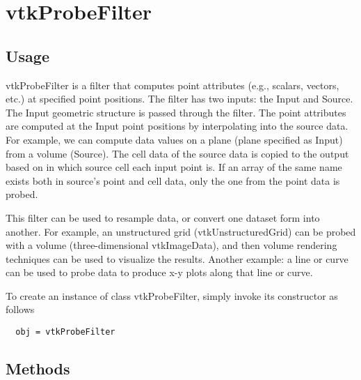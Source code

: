 \section{vtkProbeFilter}

\subsection{Usage}

 vtkProbeFilter is a filter that computes point attributes (e.g., scalars,
 vectors, etc.) at specified point positions. The filter has two inputs:
 the Input and Source. The Input geometric structure is passed through the
 filter. The point attributes are computed at the Input point positions
 by interpolating into the source data. For example, we can compute data
 values on a plane (plane specified as Input) from a volume (Source).
 The cell data of the source data is copied to the output based on in
 which source cell each input point is. If an array of the same name exists
 both in source's point and cell data, only the one from the point data is
 probed.

 This filter can be used to resample data, or convert one dataset form into
 another. For example, an unstructured grid (vtkUnstructuredGrid) can be
 probed with a volume (three-dimensional vtkImageData), and then volume
 rendering techniques can be used to visualize the results. Another example:
 a line or curve can be used to probe data to produce x-y plots along
 that line or curve.

To create an instance of class vtkProbeFilter, simply
invoke its constructor as follows
\begin{verbatim}
  obj = vtkProbeFilter
\end{verbatim}
\subsection{Methods}

